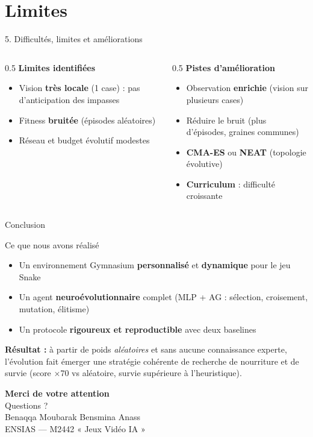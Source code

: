\documentclass[11pt,aspectratio=169]{beamer}
\begin{document}
\section{Limites}

\begin{frame}{5. Difficultés, limites et améliorations}
  \begin{columns}
    \begin{column}{0.5\textwidth}
      \textbf{Limites identifiées}
      \begin{itemize}
        \item Vision \textbf{très locale} (1 case) : pas d'anticipation des
              impasses
        \item Fitness \textbf{bruitée} (épisodes aléatoires)
        \item Réseau et budget évolutif modestes
      \end{itemize}
    \end{column}
    \begin{column}{0.5\textwidth}
      \textbf{Pistes d'amélioration}
      \begin{itemize}
        \item Observation \textbf{enrichie} (vision sur plusieurs cases)
        \item Réduire le bruit (plus d'épisodes, graines communes)
        \item \textbf{CMA-ES} ou \textbf{NEAT} (topologie évolutive)
        \item \textbf{Curriculum} : difficulté croissante
      \end{itemize}
    \end{column}
  \end{columns}
\end{frame}

\begin{frame}{Conclusion}
  \begin{block}{Ce que nous avons réalisé}
    \begin{itemize}
      \item Un environnement Gymnasium \textbf{personnalisé} et \textbf{dynamique}
            pour le jeu Snake
      \item Un agent \textbf{neuroévolutionnaire} complet (MLP + AG : sélection,
            croisement, mutation, élitisme)
      \item Un protocole \textbf{rigoureux et reproductible} avec deux baselines
    \end{itemize}
  \end{block}
  \medskip
  \textbf{Résultat :} à partir de poids \emph{aléatoires} et sans aucune
  connaissance experte, l'évolution fait émerger une stratégie cohérente de
  recherche de nourriture et de survie (score $\times 70$ vs aléatoire,
  survie supérieure à l'heuristique).
\end{frame}

\begin{frame}[plain]
  \centering
  \vfill
  {\Huge\bfseries\color{bleu} Merci de votre attention}\\[0.8cm]
  {\large Questions ?}\\[1.2cm]
  {\normalsize Benaqqa Moubarak \quad\textbullet\quad Bensmina Anass}\\
  {\footnotesize ENSIAS --- M2442 « Jeux Vidéo IA »}
  \vfill
\end{frame}
\end{document}
